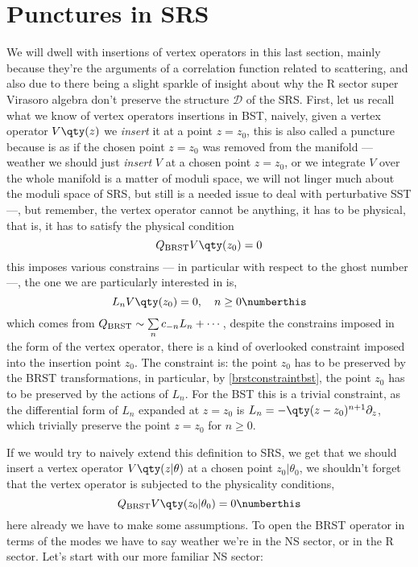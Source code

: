 \section{Punctures in SRS}
\label{sec:punc}

We will dwell with insertions of vertex operators in this last section, mainly because 
they're the arguments of a correlation function related to scattering, and also due to 
there being a slight sparkle of insight about why the R sector super Virasoro algebra 
don't preserve the structure $\mathcal D$ of the SRS. First, let us recall what we 
know of vertex operators insertions in BST, naively, given a vertex operator $V\qty(z)$ 
we \textit{insert} it at a point $z=z_0$, this is also called a puncture 
because is as if the chosen point $z=z_0$ was removed from the manifold --- weather we 
should just \textit{insert} $V$ at a chosen point $z=z_0$, or we integrate $V$ over 
the whole manifold is a matter of moduli space, we will not linger much about the 
moduli space of SRS, but still is a needed issue to deal with perturbative SST ---, but 
remember, the vertex operator cannot be anything, it has to be physical, that is, it has to 
satisfy the physical condition \[Q_{\textnormal{BRST}}V\qty(z_0)=0\] this imposes 
various constrains --- in particular with respect to the ghost number ---, the 
one we are particularly interested in is, \[L_n V\qty(z_0)=0,\ \ \ n\geq0\numberthis\label{brstconstraintbst}\] which 
comes from $Q_{\textnormal{BRST}}\sim\sum\limits_n c_{-n}L_n+\cdots$, despite the constrains imposed in the form of the 
vertex operator, there is a kind of overlooked constraint imposed into the insertion point $z_0$. The constraint is: 
the point $z_0$ has to be preserved by the BRST transformations, in particular, by \cref{brstconstraintbst}, the point 
$z_0$ has to be preserved by the actions of $L_n$. For the BST this is a trivial constraint, as the differential 
form of $L_n$ expanded at $z=z_0$ is $L_n=-\qty(z-z_0)^{n+1}\partial_z$, which trivially preserve the point $z=z_0$ 
for $n\geq0$.

If we would try to naively extend this definition to SRS, we get that we should insert a 
vertex operator $V\qty(z|\theta)$ at a chosen point $z_0|\theta_0$, we shouldn't forget that the vertex operator is 
subjected to the physicality conditions, \[Q_{\textnormal{BRST}} V\qty(z_0|\theta_0)=0\numberthis\label{BRSTcondition}\] here already we have to 
make some assumptions. To open the BRST operator in terms of the modes we have to say weather we're in the 
NS sector, or in the R sector. Let's start with our more familiar NS sector:

